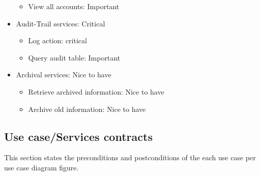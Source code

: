 \documentclass[12pt]{article}
\begin{document}
\begin{itemize}
\begin{itemize}
		\item View all accounts: Important
	\end{itemize}
	\item Audit-Trail services: Critical
	\begin{itemize}
		\item Log action: critical
		\item Query audit table: Important
	\end{itemize}
	\item Archival services: Nice to have
	\begin{itemize}
		\item Retrieve archived information: Nice to have
		\item Archive old information: Nice to have
	\end{itemize}
\end{itemize}


\vspace{0.2in}

\subsection{Use case/Services contracts} %
\vspace{0.2in}

This section states the preconditions and postconditions of the each use case per use case diagram figure. \\
\end{document}
